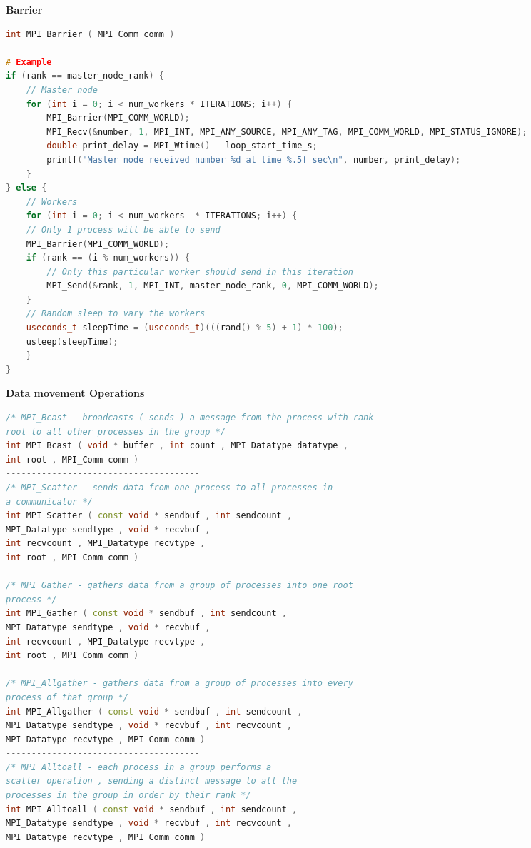 \documentclass[10pt, landscape]{article}
\begin{document}
\begin{multicols}{4}
\textbf{Barrier}
\begin{lstlisting}[language=C++, breaklines=true, breakatwhitespace=true]
int MPI_Barrier ( MPI_Comm comm )

# Example 
if (rank == master_node_rank) {
    // Master node
    for (int i = 0; i < num_workers * ITERATIONS; i++) {
        MPI_Barrier(MPI_COMM_WORLD);
        MPI_Recv(&number, 1, MPI_INT, MPI_ANY_SOURCE, MPI_ANY_TAG, MPI_COMM_WORLD, MPI_STATUS_IGNORE);
        double print_delay = MPI_Wtime() - loop_start_time_s;
        printf("Master node received number %d at time %.5f sec\n", number, print_delay);
    }
} else {
    // Workers
    for (int i = 0; i < num_workers  * ITERATIONS; i++) {
    // Only 1 process will be able to send
    MPI_Barrier(MPI_COMM_WORLD);
    if (rank == (i % num_workers)) {
        // Only this particular worker should send in this iteration
        MPI_Send(&rank, 1, MPI_INT, master_node_rank, 0, MPI_COMM_WORLD);
    }
    // Random sleep to vary the workers
    useconds_t sleepTime = (useconds_t)(((rand() % 5) + 1) * 100);
    usleep(sleepTime);
    }
}
    \end{lstlisting}


\textbf{Data movement Operations}
\begin{lstlisting}[language=C++, breaklines=true, breakatwhitespace=true]
/* MPI_Bcast - broadcasts ( sends ) a message from the process with rank
root to all other processes in the group */
int MPI_Bcast ( void * buffer , int count , MPI_Datatype datatype ,
int root , MPI_Comm comm )
--------------------------------------
/* MPI_Scatter - sends data from one process to all processes in
a communicator */
int MPI_Scatter ( const void * sendbuf , int sendcount ,
MPI_Datatype sendtype , void * recvbuf ,
int recvcount , MPI_Datatype recvtype ,
int root , MPI_Comm comm )
--------------------------------------
/* MPI_Gather - gathers data from a group of processes into one root
process */
int MPI_Gather ( const void * sendbuf , int sendcount ,
MPI_Datatype sendtype , void * recvbuf ,
int recvcount , MPI_Datatype recvtype ,
int root , MPI_Comm comm )
--------------------------------------
/* MPI_Allgather - gathers data from a group of processes into every
process of that group */
int MPI_Allgather ( const void * sendbuf , int sendcount ,
MPI_Datatype sendtype , void * recvbuf , int recvcount ,
MPI_Datatype recvtype , MPI_Comm comm )
--------------------------------------
/* MPI_Alltoall - each process in a group performs a
scatter operation , sending a distinct message to all the
processes in the group in order by their rank */
int MPI_Alltoall ( const void * sendbuf , int sendcount ,
MPI_Datatype sendtype , void * recvbuf , int recvcount ,
MPI_Datatype recvtype , MPI_Comm comm )
    \end{lstlisting}


\end{multicols}
\end{document}
